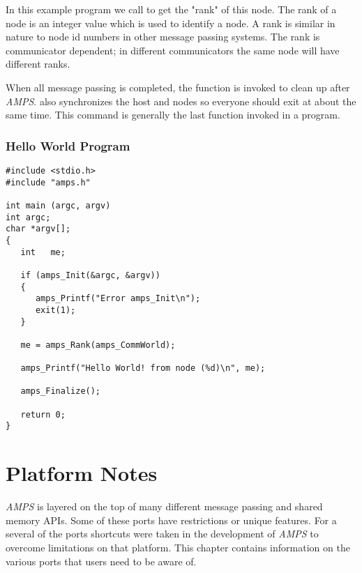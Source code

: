 In this example program we call  to get the "rank" of
this node.  The rank of a node is an integer value which is used to
identify a node.  A rank is similar in nature to node id numbers in
other message passing systems.  The rank is communicator dependent; in
different communicators the same node will have different ranks.

When all message passing is completed, the function 
is invoked to clean up after {\em AMPS}.   also
synchronizes the host and nodes so everyone should exit at about the
same time.  This command is generally the last function invoked in a
program.

\subsection{Hello World Program}
\begin{display}\begin{verbatim}
#include <stdio.h>
#include "amps.h"

int main (argc, argv)
int argc;
char *argv[];
{
   int   me;

   if (amps_Init(&argc, &argv))
   {
      amps_Printf("Error amps_Init\n");
      exit(1);
   }

   me = amps_Rank(amps_CommWorld);

   amps_Printf("Hello World! from node (%d)\n", me);

   amps_Finalize();

   return 0;
}

\end{verbatim}\end{display}


\chapter{Platform Notes}
\label{Platform Notes}

{\em AMPS} is layered on the top of many different message passing and
shared memory APIs. Some of these ports have restrictions or unique
features. For a several of the ports shortcuts were taken in the
development of {\em AMPS} to overcome limitations on that platform.
This chapter contains information on the various ports that users need
to be aware of.

